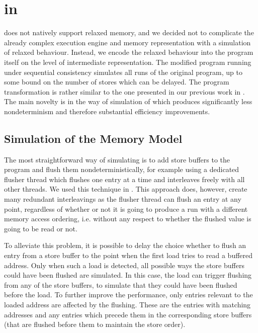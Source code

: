 
\section{\xtso in \divine}\label{sec:work}


\divine does not natively support relaxed memory, and we decided not to complicate the already complex execution engine and memory representation with a simulation of relaxed behaviour.
Instead, we encode the relaxed behaviour into the program itself on the level of \llvm intermediate representation.
The modified program running under sequential consistency simulates all \xtso runs of the original program, up to some bound on the number of stores which can be delayed.
The program transformation is rather similar to the one presented in our previous work in .
The main novelty is in the way of simulation of \xtso which produces significantly less nondeterminism and therefore substantial efficiency improvements.

\subsection{Simulation of the \xtso Memory Model}

The most straightforward way of simulating \xtso is to add store buffers to the program and flush them nondeterministically, for example using a dedicated flusher thread which flushes one entry at a time and interleaves freely with all other threads.
We used this technique in .
This approach does, however, create many redundant interleavings as the flusher
thread can flush an entry at any point, regardless of whether or not it is going
to produce a run with a different memory access ordering, i.e. without any
respect to whether the flushed value is going to be read or not.

To alleviate this problem, it is possible to delay the choice whether to flush
an entry from a store buffer to the point when the first load tries to read a buffered address.
Only when such a load is detected, all possible ways the store buffers could have been flushed are simulated.
In this case, the load can trigger flushing from any of the store buffers, to simulate that they could have been flushed before the load.
To further improve the performance, only entries relevant to the loaded address
are affected by the flushing.
These are the entries with matching addresses and any entries which precede them in the corresponding store buffers (that are flushed before them to maintain the store order).

